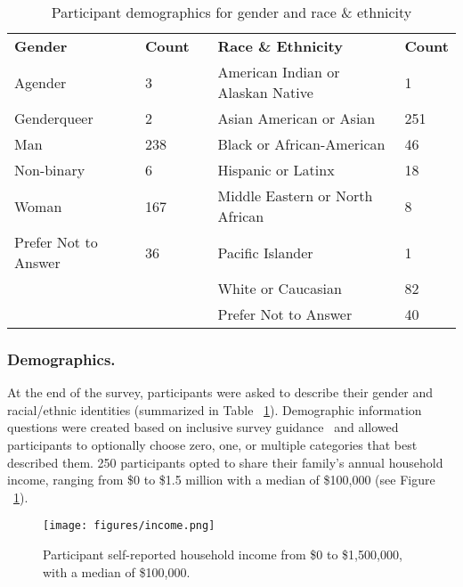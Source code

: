 \begin{table}[t]
\begin{tabular}{lllll}
\cline{1-2} \cline{4-5}
\textbf{Gender}               & \textbf{Count} &  &\textbf{ Race \& Ethnicity}               & \textbf{Count} \\ \cline{1-2} \cline{4-5} 
Agender              & 3     &  & American Indian or Alaskan Native      & 1     \\
Genderqueer          & 2     &  & Asian American or Asian         & 251   \\
Man                  & 238   &  & Black or African-American       & 46    \\
Non-binary           & 6     &  & Hispanic or Latinx              & 18    \\
Woman                & 167   &  & Middle Eastern or North African & 8     \\
Prefer Not to Answer & 36    &  & Pacific Islander                & 1    \\ \cline{1-2}
                     &       &  & White or Caucasian              & 82    \\
                     &       &  & Prefer Not to Answer            & 40    \\ \cline{4-5} 
\end{tabular}
\vspace*{3mm}
\caption{\label{tab:gender/race} Participant demographics for gender and race \& ethnicity}
\end{table}

\subsubsection{Demographics. }At the end of the survey, participants were asked to describe their gender and racial/ethnic identities (summarized in Table ~\ref{tab:gender/race}). Demographic information questions were created based on inclusive survey guidance~\cite{fernandez2016more} and allowed participants to optionally choose zero, one, or multiple categories that best described them. 250 participants opted to share their family's annual household income, ranging from \$0 to \$1.5 million with a median of \$100,000 (see Figure ~\ref{fig:income}). 

\begin{figure}[t]
    \centering
    \texttt{[image: figures/income.png]}
    \caption{Participant self-reported household income from \$0 to \$1,500,000, with a median of \$100,000.}
    \label{fig:income}
\end{figure}

